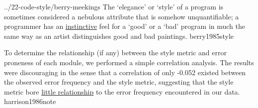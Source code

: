 \documentclass{article}
\begin{document}
\qte
  {../22-code-style/berry-meekings}
  {The `elegance' or `style' of a program is sometimes considered a nebulous attribute that is somehow unquantifiable; a programmer has an \ul{instinctive} feel for a `good' or a `bad' program in much the same way as an artist distinguishes good and bad paintings.}
  {berry1985style}

  {To determine the relationship (if any) between the style metric and error proneness of each module, we performed a simple correlation analysis. The results were discouraging in the sense that a correlation of only -0.052 existed between the observed error frequency and the style metric, suggesting that the style metric bore \ul{little relationship} to the error frequency encountered in our data.}
  {harrison1986note}
\end{document}
